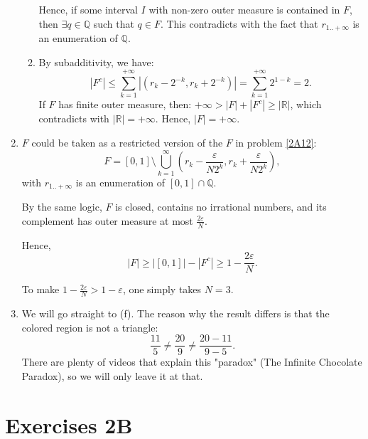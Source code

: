 \begin{enumerate}[label=\textbf{2A.\arabic*}]
\begin{enumerate}[label=(\alph*)]
      Hence, if some interval \( I \) with non-zero outer measure is contained
      in \( F \), then \( \exists q \in \mathbb{Q} \) such that \( q \in F \).
      This contradicts with the fact that \( r_{1..+\infty} \) is an enumeration
      of \( \mathbb{Q} \).
    \item By subadditivity, we have:
      \[
        |F^{c}| \le \sum_{k =1}^{+\infty} \left| (r_{k}-2^{-k}, r_{k}+2^{-k})
        \right| = \sum_{k =1 }^{+\infty} 2^{1-k} = 2
      .\] 
      If \( F \) has finite outer measure, then:
      \( +\infty > |F| + |F^{c}| \ge |\mathbb{R}| \), which contradicts with \(
      |\mathbb{R}| = +\infty\). Hence, \( |F| = +\infty \).
    \end{enumerate}

  \item \( F \) could be taken as a restricted version of the \( F \) in problem
    \ref{2A12}:
    \[
      F = [0, 1] \setminus \bigcup_{k = 1}^{\infty} \left( r_{k} -
      \frac{\varepsilon}{N 2^{k}}, r_{k} + \frac{\varepsilon}{N 2^{k}} \right) 
    ,\] with \( r_{1..+\infty} \) is an enumeration of \( [0, 1] \cap \mathbb{Q}
    \).

    By the same logic, \( F \) is closed, contains no irrational numbers, and
    its complement has outer measure at most \( \frac{2\varepsilon}{N} \).

    Hence,
    \[
      |F| \ge |[0, 1]| - |F^{c}| \ge 1 - \frac{2\varepsilon}{N}
    .\] 

    To make \( 1 - \frac{2\varepsilon}{N} > 1 - \varepsilon \), one simply takes
    \( N = 3 \).
\item We will go straight to (f). The reason why the result differs is that the
  colored region is not a triangle:
  \[
    \frac{11}{5} \neq \frac{20}{9} \neq \frac{20 - 11}{9 - 5}
  .\] 
  There are plenty of videos that explain this "paradox" (The Infinite Chocolate
  Paradox), so we will only leave it at that.
\end{enumerate}


\section{Exercises 2B} %
\label{sec:Exercises 2B}


